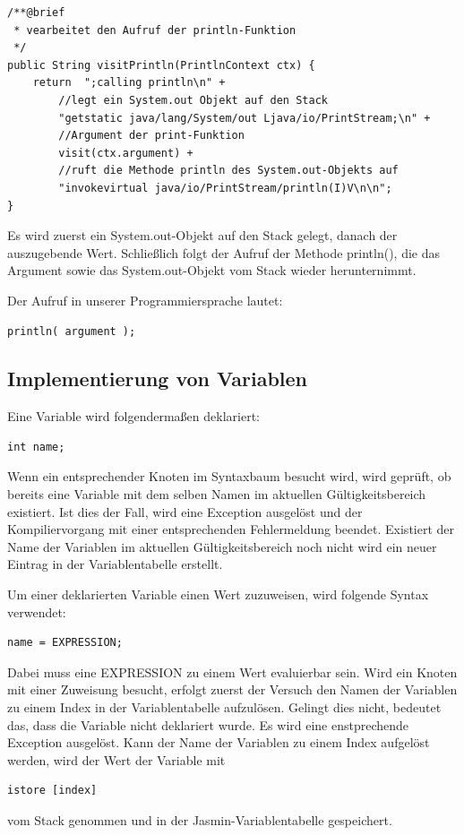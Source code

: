 \scriptsize \begin{lstlisting}[frame=single]
/**@brief
 * vearbeitet den Aufruf der println-Funktion
 */
public String visitPrintln(PrintlnContext ctx) {
	return  ";calling println\n" + 
		//legt ein System.out Objekt auf den Stack
		"getstatic java/lang/System/out Ljava/io/PrintStream;\n" + 	
		//Argument der print-Funktion
		visit(ctx.argument) + 						
		//ruft die Methode println des System.out-Objekts auf
		"invokevirtual java/io/PrintStream/println(I)V\n\n"; 				
}
\end{lstlisting}

\normalsize
Es wird zuerst ein System.out-Objekt auf den Stack gelegt, danach der auszugebende Wert. Schließlich folgt der Aufruf der Methode println(), die das Argument sowie das System.out-Objekt vom Stack wieder herunternimmt.


Der Aufruf in unserer Programmiersprache lautet: 
\begin{lstlisting}[frame=single]
println( argument );
\end{lstlisting}

\subsection{Implementierung von Variablen}
Eine Variable wird folgendermaßen deklariert:
\begin{lstlisting}[frame=single]
int name;
\end{lstlisting}
Wenn ein entsprechender Knoten im Syntaxbaum besucht wird, wird geprüft, ob bereits eine Variable mit dem selben Namen im aktuellen Gültigkeitsbereich existiert. Ist dies der Fall, wird eine Exception ausgelöst und der Kompiliervorgang mit einer entsprechenden Fehlermeldung beendet. Existiert der Name der Variablen im aktuellen Gültigkeitsbereich noch nicht wird ein neuer Eintrag in der Variablentabelle erstellt.

Um einer deklarierten Variable einen Wert zuzuweisen, wird folgende Syntax verwendet:
\begin{lstlisting}[frame=single]
name = EXPRESSION;
\end{lstlisting}
Dabei muss eine EXPRESSION zu einem Wert evaluierbar sein.
Wird ein Knoten mit einer Zuweisung besucht, erfolgt zuerst der Versuch den Namen der Variablen zu einem Index in der Variablentabelle aufzulösen. Gelingt dies nicht, bedeutet das, dass die Variable nicht deklariert wurde. Es wird eine enstprechende Exception ausgelöst. Kann der Name der Variablen zu einem Index aufgelöst werden, wird der Wert der Variable mit 
\begin{lstlisting}[frame=single]
istore [index]
\end{lstlisting}
vom Stack genommen und in der Jasmin-Variablentabelle gespeichert.

